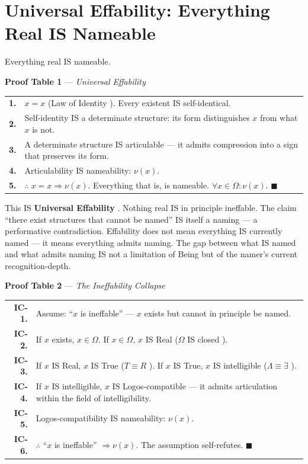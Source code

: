 \documentclass[11pt, oneside]{article}
\theoremstyle{definition}
\begin{document}
\section{Universal Effability: Everything Real IS Nameable}


Everything real IS nameable.

\textbf{Proof Table 1} --- \textit{Universal Effability}

{\small
\noindent\begin{tabular}{r p{}}
\textbf{1.} & $x = x$ (Law of Identity \cite{codex1}). Every existent IS self-identical. \\[0.3em]
\textbf{2.} & Self-identity IS a determinate structure: its form distinguishes $x$ from what $x$ is not. \\[0.3em]
\textbf{3.} & A determinate structure IS articulable --- it admits compression into a sign that preserves its form. \\[0.3em]
\textbf{4.} & Articulability IS nameability: $\nu(x)$. \\[0.3em]
\textbf{5.} & $\therefore\; x = x \Rightarrow \nu(x)$. Everything that is, is nameable. $\forall x \in \Omega: \nu(x)$. \hfill $\blacksquare$ \\[0.3em]
\end{tabular}
}

This IS \textbf{Universal Effability} \cite{codex1}. Nothing real IS in principle ineffable. The claim ``there exist structures that cannot be named'' IS itself a naming --- a performative contradiction. Effability does not mean everything IS currently named --- it means everything admits naming. The gap between what IS named and what admits naming IS not a limitation of Being but of the namer's current recognition-depth.

\textbf{Proof Table 2} --- \textit{The Ineffability Collapse}

{\small
\noindent\begin{tabular}{r p{}}
\textbf{IC-1.} & Assume: ``$x$ is ineffable'' --- $x$ exists but cannot in principle be named. \\[0.3em]
\textbf{IC-2.} & If $x$ exists, $x \in \Omega$. If $x \in \Omega$, $x$ IS Real ($\Omega$ IS closed \cite{codex1}). \\[0.3em]
\textbf{IC-3.} & If $x$ IS Real, $x$ IS True ($T \equiv R$ \cite{codex1}). If $x$ IS True, $x$ IS intelligible ($\Lambda \equiv \exists$ \cite{codex2}). \\[0.3em]
\textbf{IC-4.} & If $x$ IS intelligible, $x$ IS Logos-compatible --- it admits articulation within the field of intelligibility. \\[0.3em]
\textbf{IC-5.} & Logos-compatibility IS nameability: $\nu(x)$. \\[0.3em]
\textbf{IC-6.} & $\therefore$ ``$x$ is ineffable'' $\Rightarrow \nu(x)$. The assumption self-refutes. \hfill $\blacksquare$ \\[0.3em]
\end{tabular}
}
\end{document}
